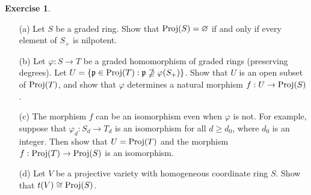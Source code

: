 \documentclass[11pt]{book}
\theoremstyle{definition}
\newtheorem{exercise}{Exercise}[section]
\begin{document}
\begin{exercise}
\mbox{}
\begin{itemize}
\item[(a)] Let $S$ be a graded ring. Show that $\mathrm{Proj}(S)=\varnothing$ if and only if every element of $S_+$ is nilpotent.
\item[(b)] Let $\varphi:S\to T$ be a graded homomorphism of graded rings (preserving degrees). Let $U=\{\mathfrak{p}\in\mathrm{Proj}(T):\mathfrak{p}\nsupseteq\varphi(S_+)\}$. Show that $U$ is an open subset of $\mathrm{Proj}(T)$, and show that $\varphi$ determines a natural morphism $f:U\to\mathrm{Proj}(S)$.
\item[(c)] The morphism $f$ can be an isomorphism even when $\varphi$ is not. For example, suppose that $\varphi_d:S_d\to T_d$ is an isomorphism for all $d\geq d_0$, where $d_0$ is an integer. Then show that $U=\mathrm{Proj}(T)$ and the morphism $f:\mathrm{Proj}(T)\to\mathrm{Proj}(S)$ is an isomorphism.
\item[(d)] Let $V$ be a projective variety with homogeneous coordinate ring $S$. Show that $t(V)\cong \mathrm{Proj}(S)$.
\end{itemize}
\end{exercise}
\end{document}
